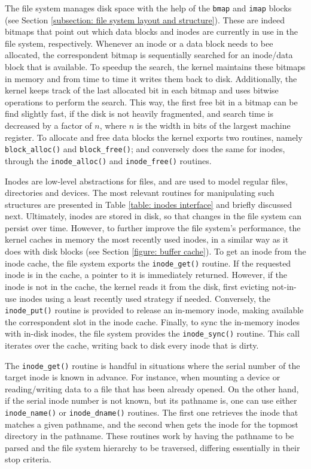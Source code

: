 		The file system manages disk space with the help of the
		\texttt{bmap} and \texttt{imap} blocks (see Section
		\ref{subsection: file system layout and structure}). These are
		indeed bitmaps that point out which data blocks and inodes are
		currently in use in the file system, respectively. Whenever an
		inode or a data block needs to bee allocated, the correspondent
		bitmap is sequentially searched for an inode/data block that is
		available. To speedup the search, the kernel maintains these
		bitmaps in memory and from time to time it writes them back to
		disk. Additionally, the kernel keeps track of the last allocated
		bit in each bitmap and uses bitwise operations to perform the
		search. This way, the first free bit in a bitmap can be find
		slightly fast, if the disk is not heavily fragmented, and search
		time is decreased by a factor of $n$, where $n$ is the width in
		bits of the largest machine register. To allocate and free data
		blocks the kernel exports two routines, namely
		\texttt{block\_alloc()} and \texttt{block\_free()}; and
		conversely does the same for inodes, through the
		\texttt{inode\_alloc()} and \texttt{inode\_free()} routines.

		Inodes are low-level abstractions for files, and are used to
		model regular files, directories and devices. The most relevant
		routines for manipulating such structures are presented in Table
		\ref{table: inodes interface} and briefly discussed next.
		Ultimately, inodes are stored in disk, so that changes in the
		file system can persist over time. However, to further improve
		the file system's performance, the kernel caches in memory the
		most recently used inodes, in a similar way as it does with disk
		blocks (see Section \ref{figure: buffer cache}). To get an inode
		from the inode cache, the file system exports the
		\texttt{inode\_get()} routine. If the requested inode is in the
		cache, a pointer to it is immediately returned. However, if the
		inode is not in the cache, the kernel reads it from the disk,
		first evicting not-in-use inodes using a least recently used
		strategy if needed. Conversely, the \texttt{inode\_put()}
		routine is provided to release an in-memory inode, making
		available the correspondent slot in the inode cache. Finally, to
		sync the in-memory inodes with in-disk inodes, the file system
		provides the \texttt{inode\_sync()} routine. This call iterates
		over the cache, writing back to disk every inode that is dirty.

		The \texttt{inode\_get()} routine is handful in situations where
		the serial number of the target inode is known in advance. For
		instance, when mounting a device or reading/writing data to a
		file that has been already opened. On the other hand, if the
		serial inode number is not known, but its pathname is, one can
		use either \texttt{inode\_name()} or \texttt{inode\_dname()}
		routines. The first one retrieves the inode that matches a given
		pathname, and the second when gets the inode for the topmost
		directory in the pathname. These routines work by having the
		pathname to be parsed and the file system hierarchy to be
		traversed, differing essentially in their stop criteria.

